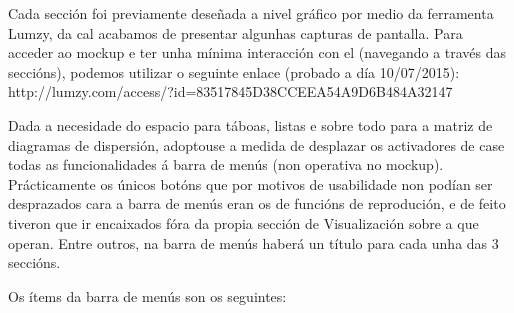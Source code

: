Cada sección foi previamente deseñada a nivel gráfico por medio da ferramenta Lumzy, da cal acabamos de presentar algunhas capturas de pantalla. Para acceder ao mockup e ter unha mínima interacción con el (navegando a través das seccións), podemos utilizar o seguinte enlace (probado a día 10/07/2015):
\\
http://lumzy.com/access/?id=83517845D38CCEEA54A9D6B484A32147

Dada a necesidade do espacio para táboas, listas e sobre todo para a matriz de diagramas de dispersión, adoptouse a medida de desplazar os activadores de case todas as funcionalidades á barra de menús (non operativa no mockup). Prácticamente os únicos botóns que por motivos de usabilidade non podían ser desprazados cara a barra de menús eran os de funcións de reprodución, e de feito tiveron que ir encaixados fóra da propia sección de Visualización sobre a que operan. Entre outros, na barra de menús haberá un título para cada unha das 3 seccións.

Os ítems da barra de menús son os seguintes:

